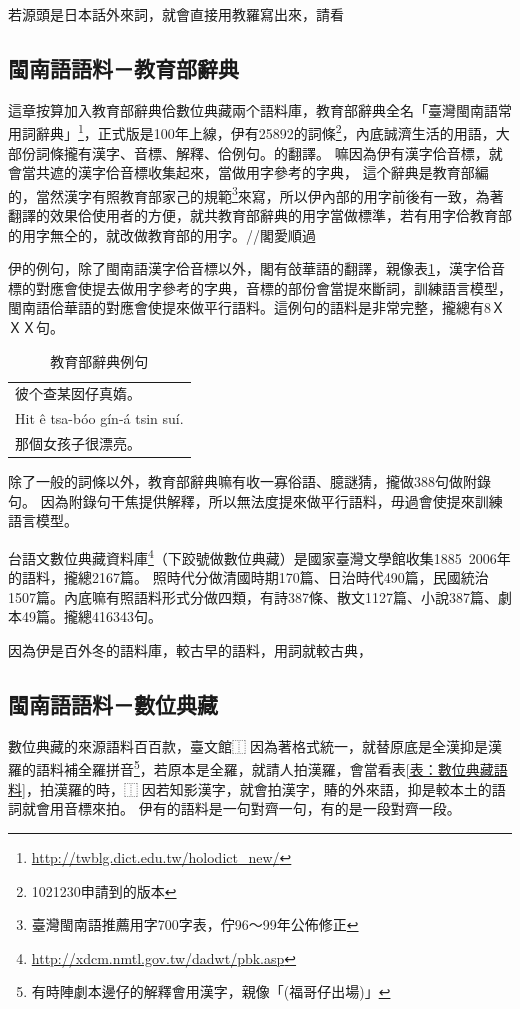 若源頭是日本話外來詞，就會直接用教羅寫出來，請看

\subsection{閩南語語料－教育部辭典}
\label{節：教育部辭典}
這章按算加入教育部辭典佮數位典藏兩个語料庫，教育部辭典全名「臺灣閩南語常用詞辭典」\footnote{\url{http://twblg.dict.edu.tw/holodict_new/}}，正式版是100年上線，伊有25892的詞條\footnote{1021230申請到的版本}，內底誠濟生活的用語，大部份詞條攏有漢字、音標、解釋、佮例句。的翻譯。
嘛因為伊有漢字佮音標，就會當共遮的漢字佮音標收集起來，當做用字參考的字典，
這个辭典是教育部編的，當然漢字有照教育部家己的規範\footnote{臺灣閩南語推薦用字700字表，佇96～99年公佈修正}來寫，所以伊內部的用字前後有一致，為著翻譯的效果佮使用者的方便，就共教育部辭典的用字當做標準，若有用字佮教育部的用字無仝的，就改做教育部的用字。//閣愛順過

伊的例句，除了閩南語漢字佮音標以外，閣有敆華語的翻譯，親像表\ref{表：教育部辭典例句}，漢字佮音標的對應會使提去做用字參考的字典，音標的部份會當提來斷詞，訓練語言模型，閩南語佮華語的對應會使提來做平行語料。這例句的語料是非常完整，攏總有8ＸＸＸ句。
\begin{table}
\caption{教育部辭典例句}
\label{表：教育部辭典例句}
\centering
\begin{tabular}{l}
彼个查某囡仔真媠。 \\
Hit ê tsa-bóo gín-á tsin suí.\\
那個女孩子很漂亮。\\
\end{tabular}
\end{table}

除了一般的詞條以外，教育部辭典嘛有收一寡俗語、臆謎猜，攏做388句做附錄句。
因為附錄句干焦提供解釋，所以無法度提來做平行語料，毋過會使提來訓練語言模型。

台語文數位典藏資料庫\footnote{\url{http://xdcm.nmtl.gov.tw/dadwt/pbk.asp}}（下跤號做數位典藏）是國家臺灣文學館收集1885~2006年的語料，攏總2167篇。
照時代分做清國時期170篇、日治時代490篇，民國統治1507篇。內底嘛有照語料形式分做四類，有詩387條、散文1127篇、小說387篇、劇本49篇。攏總416343句。

因為伊是百外冬的語料庫，較古早的語料，用詞就較古典， %

\subsection{閩南語語料－數位典藏}
\label{節：數位典藏}
數位典藏的來源語料百百款，臺文館⿰因為著格式統一，就替原底是全漢抑是漢羅的語料補全羅拼音\footnote{有時陣劇本邊仔的解釋會用漢字，親像「(福哥仔出場)」}，若原本是全羅，就請人拍漢羅，會當看表\ref{表：數位典藏語料}，拍漢羅的時，⿰因若知影漢字，就會拍漢字，賰的外來語，抑是較本土的語詞就會用音標來拍。
伊有的語料是一句對齊一句，有的是一段對齊一段。

